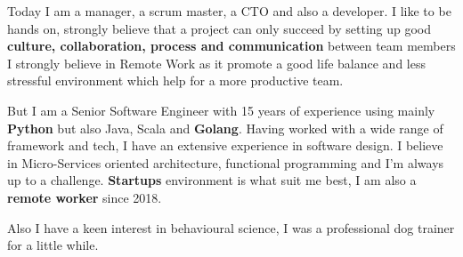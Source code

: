 

\begin{cvparagraph}

Today I am a manager, a scrum master, a CTO and also a developer.\newline
I like to be hands on, strongly believe that a project can only succeed by setting up good \textbf{culture, collaboration, process and communication} between team members
I strongly believe in Remote Work as it promote a good life balance and less stressful environment which help for a more productive team.

But I am a Senior Software Engineer with 15 years of experience using mainly \textbf{Python} but also Java, Scala and \textbf{Golang}.\newline
Having worked with a wide range of framework and tech, I have an extensive experience in software design.\newline
I believe in Micro-Services oriented architecture, functional programming and I'm always up to a challenge.\newline
\textbf{Startups} environment is what suit me best, I am also a \textbf{remote worker} since 2018.

Also I have a keen interest in behavioural science, I was a professional dog trainer for a little while.

\end{cvparagraph}
